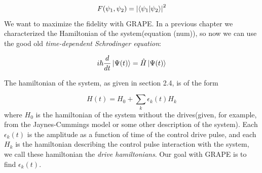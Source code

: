 \documentclass[english, a4paper, 12pt, twoside]{article}
\numberwithin{equation}{section} %
\begin{document}
\begin{equation} \label{def:fid}
F(\psi_1, \psi_2) = \abs{\braket{\psi_1}{\psi_2}}^2
\end{equation}
We want to maximize the fidelity with GRAPE.
In a previous chapter we characterized the Hamiltonian of the system(equation (num)), so now we can use the good old \textit{time-dependent Schrodinger equation}:

\begin{equation}
i\hbar\frac{d}{dt}\ket{\Psi(t)} = \hat{H}\ket{\Psi(t)}
\end{equation}

The hamiltonian of the system, as given in section 2.4, is of the  form %

\begin{equation} \label{eq:hamiltonianl_form}
H(t) = H_0 + \sum_k{\epsilon_k(t) H_k} %
\end{equation}
where $H_0$ is the hamiltonian of the system without the drives(given, for example, from the Jaynes-Cummings model or some other description of the system). Each $\epsilon_k(t)$ is the amplitude as a function of time of the control drive pulse, and each $H_k$ is the hamiltonian describing the control pulse interaction with the system, we call these hamiltonian the \textit{drive hamiltonians}. Our goal with GRAPE is to find $\epsilon_k(t)$.
\end{document}

